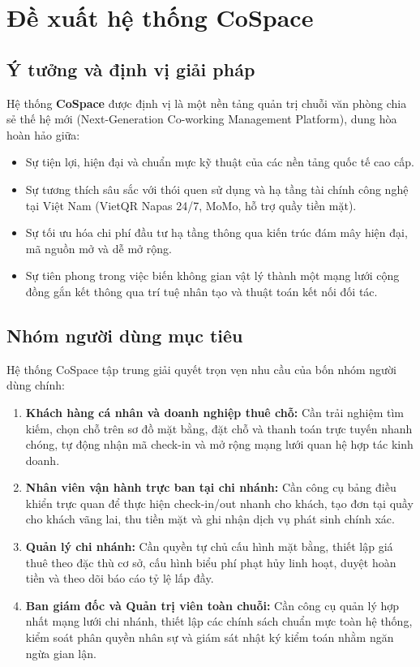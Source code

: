 \section{Đề xuất hệ thống CoSpace}
\label{sec:dexuat}

\subsection{Ý tưởng và định vị giải pháp}
Hệ thống \textbf{CoSpace} được định vị là một nền tảng quản trị chuỗi văn phòng chia sẻ thế hệ mới (Next-Generation Co-working Management Platform), dung hòa hoàn hảo giữa:
\begin{itemize}
    \item Sự tiện lợi, hiện đại và chuẩn mực kỹ thuật của các nền tảng quốc tế cao cấp.
    \item Sự tương thích sâu sắc với thói quen sử dụng và hạ tầng tài chính công nghệ tại Việt Nam (VietQR Napas 24/7, MoMo, hỗ trợ quầy tiền mặt).
    \item Sự tối ưu hóa chi phí đầu tư hạ tầng thông qua kiến trúc đám mây hiện đại, mã nguồn mở và dễ mở rộng.
    \item Sự tiên phong trong việc biến không gian vật lý thành một mạng lưới cộng đồng gắn kết thông qua trí tuệ nhân tạo và thuật toán kết nối đối tác.
\end{itemize}

\subsection{Nhóm người dùng mục tiêu}
Hệ thống CoSpace tập trung giải quyết trọn vẹn nhu cầu của bốn nhóm người dùng chính:
\begin{enumerate}
    \item \textbf{Khách hàng cá nhân và doanh nghiệp thuê chỗ:} Cần trải nghiệm tìm kiếm, chọn chỗ trên sơ đồ mặt bằng, đặt chỗ và thanh toán trực tuyến nhanh chóng, tự động nhận mã check-in và mở rộng mạng lưới quan hệ hợp tác kinh doanh.
    \item \textbf{Nhân viên vận hành trực ban tại chi nhánh:} Cần công cụ bảng điều khiển trực quan để thực hiện check-in/out nhanh cho khách, tạo đơn tại quầy cho khách vãng lai, thu tiền mặt và ghi nhận dịch vụ phát sinh chính xác.
    \item \textbf{Quản lý chi nhánh:} Cần quyền tự chủ cấu hình mặt bằng, thiết lập giá thuê theo đặc thù cơ sở, cấu hình biểu phí phạt hủy linh hoạt, duyệt hoàn tiền và theo dõi báo cáo tỷ lệ lấp đầy.
    \item \textbf{Ban giám đốc và Quản trị viên toàn chuỗi:} Cần công cụ quản lý hợp nhất mạng lưới chi nhánh, thiết lập các chính sách chuẩn mực toàn hệ thống, kiểm soát phân quyền nhân sự và giám sát nhật ký kiểm toán nhằm ngăn ngừa gian lận.
\end{enumerate}


